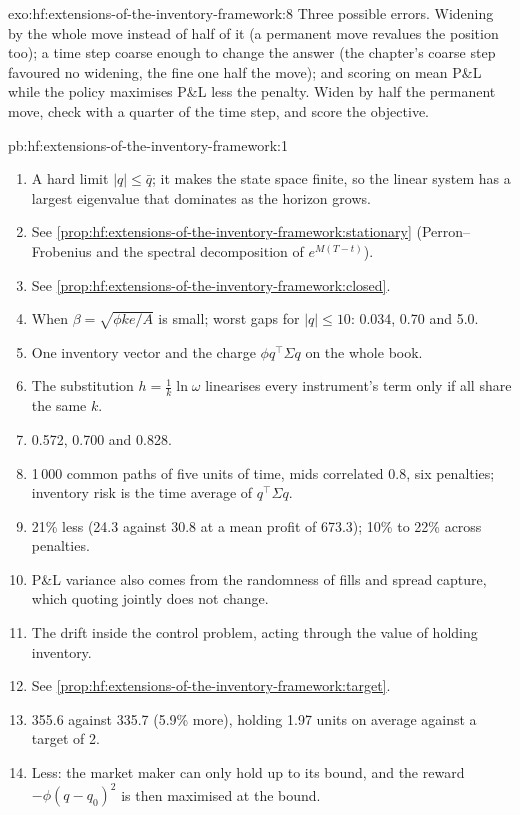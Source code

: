 \begin{solution}{exo:hf:extensions-of-the-inventory-framework:8}
Three possible errors. Widening by the whole move instead of half of it (a permanent move revalues the position too); a time step coarse enough to
change the answer (the chapter's coarse step favoured no widening, the fine one half the move); and scoring on mean P\&L while the policy maximises
P\&L less the penalty. Widen by half the permanent move, check with a quarter of the time step, and score the objective.
\end{solution}

\begin{solution}{pb:hf:extensions-of-the-inventory-framework:1}
\begin{enumerate}
\item A hard limit $|q|\le\bar q$; it makes the state space finite, so the linear system has a largest eigenvalue that dominates as the horizon grows.
\item See \cref{prop:hf:extensions-of-the-inventory-framework:stationary} (Perron--Frobenius and the spectral decomposition of $e^{M(T-t)}$).
\item See \cref{prop:hf:extensions-of-the-inventory-framework:closed}.
\item When $\beta=\sqrt{\phi ke/A}$ is small; worst gaps for $|q|\le10$: 0.034, 0.70 and 5.0.
\item One inventory vector and the charge $\phi q^\top\Sigma q$ on the whole book.
\item The substitution $h=\tfrac1k\ln\omega$ linearises every instrument's term only if all share the same $k$.
\item 0.572, 0.700 and 0.828.
\item 1\,000 common paths of five units of time, mids correlated 0.8, six penalties; inventory risk is the time average of $q^\top\Sigma q$.
\item 21\% less (24.3 against 30.8 at a mean profit of 673.3); 10\% to 22\% across penalties.
\item P\&L variance also comes from the randomness of fills and spread capture, which quoting jointly does not change.
\item The drift inside the control problem, acting through the value of holding inventory.
\item See \cref{prop:hf:extensions-of-the-inventory-framework:target}.
\item 355.6 against 335.7 (5.9\% more), holding 1.97 units on average against a target of 2.
\item Less: the market maker can only hold up to its bound, and the reward $-\phi(q-q_0)^2$ is then maximised at the bound.

\end{enumerate}
\end{solution}
